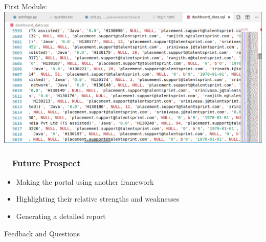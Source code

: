 \documentclass{beamer}
\begin{document}
\begin{frame}
\centering
First Module:
\includegraphics[width = 15cm]{1.png}
\end{frame}

\begin{frame}
\frametitle{ ~ Future Prospect} 
\begin{itemize}
\item{Making the portal using another framework}
\item{Highlighting their relative strengths and weaknesses}
\item{Generating a detailed report}
\end{itemize}
\end{frame}



\begin{frame}
\Huge{Feedback and Questions}
\end{frame}

\end{document}
